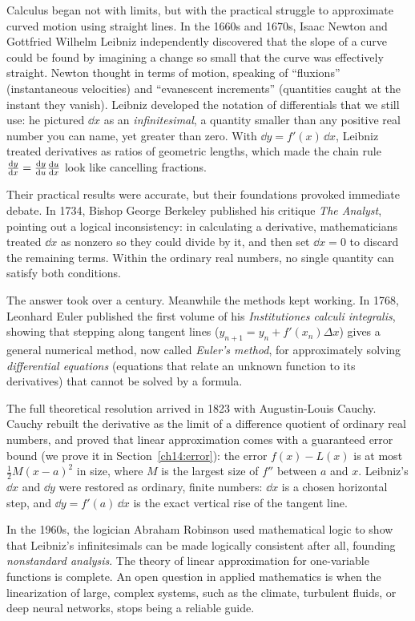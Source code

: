 \begin{historybox}
Calculus began not with limits, but with the practical struggle to approximate curved motion using straight lines. In the 1660s and 1670s, Isaac Newton and Gottfried Wilhelm Leibniz independently discovered that the slope of a curve could be found by imagining a change so small that the curve was effectively straight. Newton thought in terms of motion, speaking of ``fluxions'' (instantaneous velocities) and ``evanescent increments'' (quantities caught at the instant they vanish). Leibniz developed the notation of differentials that we still use: he pictured $\dd x$ as an \emph{infinitesimal}, a quantity smaller than any positive real number you can name, yet greater than zero. With $\dd y = f'(x)\,\dd x$, Leibniz treated derivatives as ratios of geometric lengths, which made the chain rule $\frac{\mathrm{d} y}{\mathrm{d} x}=\frac{\mathrm{d} y}{\mathrm{d} u}\frac{\mathrm{d} u}{\mathrm{d} x}$ look like cancelling fractions.

Their practical results were accurate, but their foundations provoked immediate debate. In 1734, Bishop George Berkeley published his critique \emph{The Analyst}, pointing out a logical inconsistency: in calculating a derivative, mathematicians treated $\dd x$ as nonzero so they could divide by it, and then set $\dd x = 0$ to discard the remaining terms. Within the ordinary real numbers, no single quantity can satisfy both conditions.

The answer took over a century. Meanwhile the methods kept working. In 1768, Leonhard Euler published the first volume of his \emph{Institutiones calculi integralis}, showing that stepping along tangent lines ($y_{n+1} = y_n + f'(x_n)\Delta x$) gives a general numerical method, now called \emph{Euler's method}, for approximately solving \emph{differential equations} (equations that relate an unknown function to its derivatives) that cannot be solved by a formula.

The full theoretical resolution arrived in 1823 with Augustin-Louis Cauchy. Cauchy rebuilt the derivative as the limit of a difference quotient of ordinary real numbers, and proved that linear approximation comes with a guaranteed error bound (we prove it in Section~\ref{ch14:error}): the error $f(x) - L(x)$ is at most $\frac{1}{2} M (x-a)^2$ in size, where $M$ is the largest size of $f''$ between $a$ and $x$. Leibniz's $\dd x$ and $\dd y$ were restored as ordinary, finite numbers: $\dd x$ is a chosen horizontal step, and $\dd y = f'(a)\,\dd x$ is the exact vertical rise of the tangent line.

In the 1960s, the logician Abraham Robinson used mathematical logic to show that Leibniz's infinitesimals can be made logically consistent after all, founding \emph{nonstandard analysis}. The theory of linear approximation for one-variable functions is complete. An open question in applied mathematics is when the linearization of large, complex systems, such as the climate, turbulent fluids, or deep neural networks, stops being a reliable guide.
\end{historybox}

